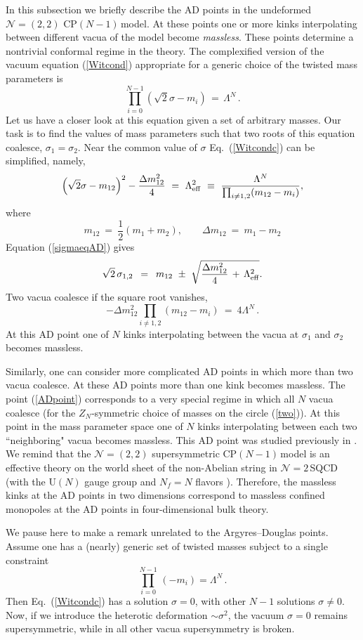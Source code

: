 \documentclass[epsfig,12pt]{article}
\def\beq{\begin{equation}}
\def\eeq{\end{equation}}
\newcommand{\ntwo}{${\mathcal N}=2\,$}
\newcommand{\cpn}{CP$(N-1)\,$}
\newcommand{\zn}{$Z_N$}
\def\beq{\begin{equation}}
\def\eeq{\end{equation}}
\newcommand{\ntwot}{${\mathcal N}= \left(2,2\right) $ }
\begin{document}
{In this subsection we briefly describe the AD points in the undeformed \ntwot \cpn model.
At these points one or more kinks interpolating between different vacua of the model become
{\em massless}. These points determine a nontrivial conformal regime in the
theory. The complexified version of the vacuum equation (\ref{Witcond}) 
appropriate for a generic choice of the twisted mass parameters is
\beq
\prod_{i=0}^{N-1}\left(\sqrt{2}\sigma-m_i\right) \,=\,\Lambda^N \,.
\label{Witcondc}
\eeq
Let us have a closer look at this equation given a set of arbitrary masses.
Our task is to find  the values of mass parameters such that
two roots of this equation coalesce, $\sigma_1=\sigma_2$.  Near the common value of
$\sigma$ Eq.~(\ref{Witcondc}) can be simplified, namely,
\beq
\left(\sqrt{2}\sigma-m_{12}\right)^2-\frac{\Delta m^2_{12}}{4} ~=~ \Lambda_{\rm eff}^2 ~\equiv~ 
\frac{\Lambda^N}{\prod_{i\neq 1,2}(m_{12}-m_i)},
\label{sigmaeqAD}
\eeq
where
\beq
m_{12}~=~\frac12(m_1+m_2),\qquad \Delta m_{12}~=~m_1-m_2
\label{m12}
\eeq
Equation (\ref{sigmaeqAD}) gives
\beq
\sqrt{2}\,\sigma_{1,2} \,~=~\, m_{12} ~\pm~ \sqrt{\frac{\Delta m^2_{12}}{4} \,+\, \Lambda_{\rm eff}^2}.
\eeq
Two vacua coalesce if the square root vanishes,
\beq
-\Delta m^2_{12}\prod_{i\neq 1,2}(m_{12}-m_i) ~=~ 4\Lambda^N\,.
\label{AD}
\eeq
At this AD point one of $N$ kinks interpolating between the vacua at $\sigma_1$ and $\sigma_2$
becomes massless.

Similarly, one can consider more complicated AD points in which more than two vacua coalesce.
At these AD points more than one kink becomes massless. The point (\ref{ADpoint})
corresponds to a very special  regime in which  all $N$ vacua coalesce (for the \zn-symmetric choice of 
masses   on the circle (\ref{two})). At this point in the mass parameter space one of $N$ kinks interpolating between each two ``neighboring" vacua becomes massless. This AD point was
studied previously  in \cite{Tadpoint}. We remind that the \ntwot supersymmetric \cpn model
is an effective theory on the world sheet of the non-Abelian string in \ntwo SQCD
(with the U$(N)$ gauge group and $N_f=N$   flavors \cite{HT1,ABEKY,SYmon,HT2}).
Therefore, the massless kinks at the AD points in two dimensions correspond to massless confined monopoles
at the AD points in four-dimensional bulk theory.

We pause here to make a remark unrelated to the Argyres--Douglas points. Assume one has a (nearly) generic
set of twisted masses subject to a single constraint
\beq
\prod_{i=0}^{N-1}\,(-m_i)  = \Lambda^N\,.
\label{weass}
\eeq
Then Eq.~(\ref{Witcondc}) has a solution $\sigma =0$, with other $N-1$ solutions
$\sigma\neq 0$. Now, if we introduce the heterotic deformation $\sim \sigma^2$,
the vacuum $\sigma =0$ remains supersymmetric, while in all other vacua supersymmetry
is broken.

}
\end{document}
